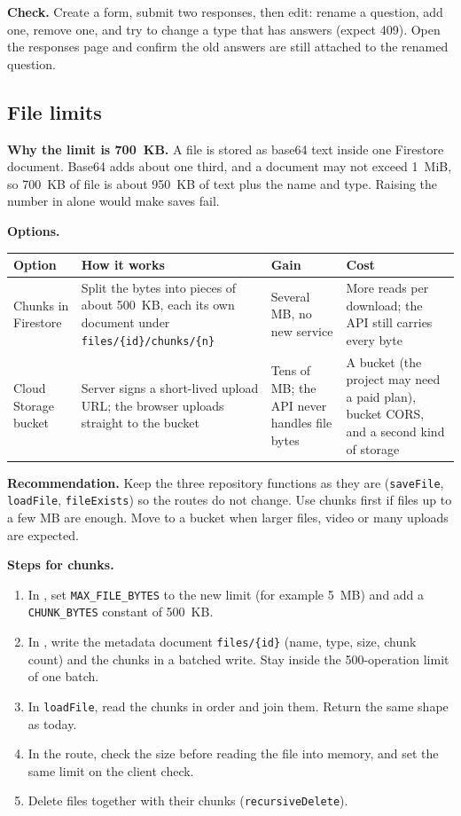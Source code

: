 \documentclass[11pt,a4paper]{article}
\begin{document}
\textbf{Check.} Create a form, submit two responses, then edit: rename a question, add one, remove one, and try to change a type that has answers (expect 409). Open the responses page and confirm the old answers are still attached to the renamed question.

\clearpage
\subsection{File limits}\label{sec:filelimits}
\textbf{Why the limit is 700~KB.} A file is stored as base64 text inside one Firestore document. Base64 adds about one third, and a document may not exceed 1~MiB, so 700~KB of file is about 950~KB of text plus the name and type. Raising the number in  alone would make saves fail.

\textbf{Options.}
\begin{center}
\begin{tabular}{@{}p{3.2cm}p{4.2cm}p{3.6cm}p{3.6cm}@{}}
\toprule
\textbf{Option} & \textbf{How it works} & \textbf{Gain} & \textbf{Cost}\\
\midrule
Chunks in Firestore & Split the bytes into pieces of about 500~KB, each its own document under \texttt{files/\{id\}/chunks/\{n\}} & Several MB, no new service & More reads per download; the API still carries every byte\\
Cloud Storage bucket & Server signs a short-lived upload URL; the browser uploads straight to the bucket & Tens of MB; the API never handles file bytes & A bucket (the project may need a paid plan), bucket CORS, and a second kind of storage\\
\bottomrule
\end{tabular}
\end{center}

\textbf{Recommendation.} Keep the three repository functions as they are (\texttt{saveFile}, \texttt{loadFile}, \texttt{fileExists}) so the routes do not change. Use chunks first if files up to a few MB are enough. Move to a bucket when larger files, video or many uploads are expected.

\textbf{Steps for chunks.}
\begin{enumerate}
  \item In , set \texttt{MAX\_FILE\_BYTES} to the new limit (for example 5~MB) and add a \texttt{CHUNK\_BYTES} constant of 500~KB.
  \item In , write the metadata document \texttt{files/\{id\}} (name, type, size, chunk count) and the chunks in a batched write. Stay inside the 500-operation limit of one batch.
  \item In \texttt{loadFile}, read the chunks in order and join them. Return the same shape as today.
  \item In the route, check the size before reading the file into memory, and set the same limit on the client check.
  \item Delete files together with their chunks (\texttt{recursiveDelete}).
\end{enumerate}
\end{document}
